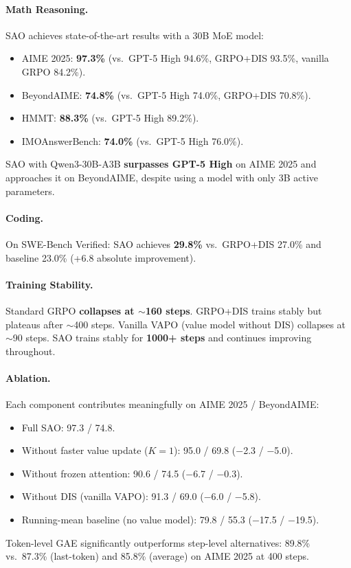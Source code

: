 \documentclass[11pt,a4paper]{article}
\begin{document}
\paragraph{Math Reasoning.} SAO achieves state-of-the-art results with a 30B MoE model:
\begin{itemize}
\item AIME 2025: \textbf{97.3\%} (vs.\ GPT-5 High 94.6\%, GRPO+DIS 93.5\%, vanilla GRPO 84.2\%).
\item BeyondAIME: \textbf{74.8\%} (vs.\ GPT-5 High 74.0\%, GRPO+DIS 70.8\%).
\item HMMT: \textbf{88.3\%} (vs.\ GPT-5 High 89.2\%).
\item IMOAnswerBench: \textbf{74.0\%} (vs.\ GPT-5 High 76.0\%).
\end{itemize}
SAO with Qwen3-30B-A3B \textbf{surpasses GPT-5 High} on AIME 2025 and approaches it on BeyondAIME, despite using a model with only 3B active parameters.

\paragraph{Coding.} On SWE-Bench Verified: SAO achieves \textbf{29.8\%} vs.\ GRPO+DIS 27.0\% and baseline 23.0\% (+6.8 absolute improvement).

\paragraph{Training Stability.} Standard GRPO \textbf{collapses at $\sim$160 steps}. GRPO+DIS trains stably but plateaus after $\sim$400 steps. Vanilla VAPO (value model without DIS) collapses at $\sim$90 steps. SAO trains stably for \textbf{1000+ steps} and continues improving throughout.

\paragraph{Ablation.} Each component contributes meaningfully on AIME 2025 / BeyondAIME:
\begin{itemize}
\item Full SAO: 97.3 / 74.8.
\item Without faster value update ($K=1$): 95.0 / 69.8 ($-$2.3 / $-$5.0).
\item Without frozen attention: 90.6 / 74.5 ($-$6.7 / $-$0.3).
\item Without DIS (vanilla VAPO): 91.3 / 69.0 ($-$6.0 / $-$5.8).
\item Running-mean baseline (no value model): 79.8 / 55.3 ($-$17.5 / $-$19.5).
\end{itemize}
Token-level GAE significantly outperforms step-level alternatives: 89.8\% vs.\ 87.3\% (last-token) and 85.8\% (average) on AIME 2025 at 400 steps.
\end{document}
